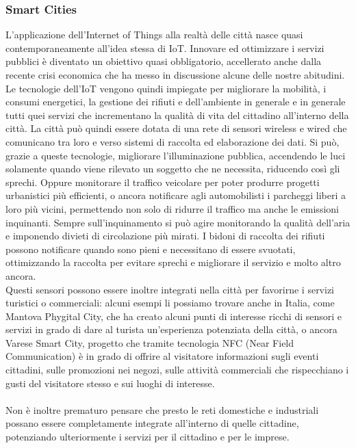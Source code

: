 \subsubsection{Smart Cities}
L'applicazione dell'Internet of Things alla realtà delle città nasce quasi contemporaneamente all'idea stessa di IoT. Innovare ed ottimizzare i servizi pubblici è diventato un obiettivo quasi obbligatorio, accellerato anche dalla recente crisi economica che ha messo in discussione alcune delle nostre abitudini. Le tecnologie dell'IoT vengono quindi impiegate per migliorare la mobilità, i consumi energetici, la gestione dei rifiuti e dell'ambiente in generale e in generale tutti quei servizi che incrementano la qualità di vita del cittadino all'interno della città. La città può quindi essere dotata di una rete di sensori wireless e wired che comunicano tra loro e verso sistemi di raccolta ed elaborazione dei dati. Si può, grazie a queste tecnologie, migliorare l'illuminazione pubblica, accendendo le luci solamente quando viene rilevato un soggetto che ne necessita, riducendo così gli sprechi. Oppure monitorare il traffico veicolare per poter produrre progetti urbanistici più efficienti, o ancora notificare agli automobilisti i parcheggi liberi a loro più vicini, permettendo non solo di ridurre il traffico ma anche le emissioni inquinanti. Sempre sull'inquinamento si può agire monitorando la qualità dell'aria e imponendo divieti di circolazione più mirati. I bidoni di raccolta dei rifiuti possono notificare quando sono pieni e necessitano di essere svuotati, ottimizzando la raccolta per evitare sprechi e migliorare il servizio e molto altro ancora.
\\Questi sensori possono essere inoltre integrati nella città per favorirne i servizi turistici o commerciali: alcuni esempi li possiamo trovare anche in Italia, come Mantova Phygital City, che ha creato alcuni punti di interesse ricchi di sensori e servizi in grado di dare al turista un'esperienza potenziata della città, o ancora Varese Smart City, progetto che tramite tecnologia NFC (Near Field Communication) è in grado di offrire al visitatore informazioni sugli eventi cittadini, sulle promozioni nei negozi, sulle attività commerciali che rispecchiano i gusti del visitatore stesso e sui luoghi di interesse.
\\\\Non è inoltre prematuro pensare che presto le reti domestiche e industriali possano essere completamente integrate all'interno di quelle cittadine, potenziando ulteriormente i servizi per il cittadino e per le imprese.

